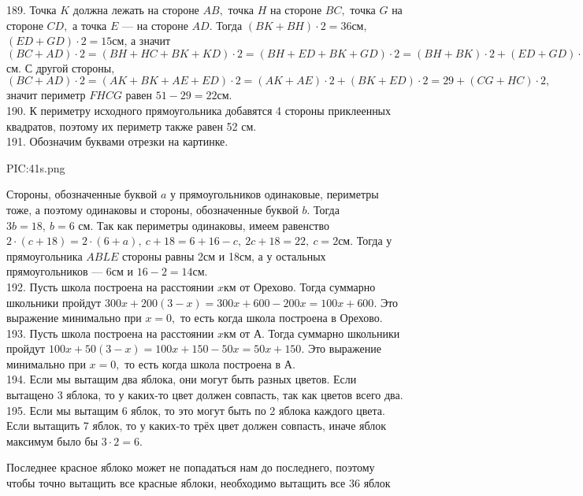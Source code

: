 189. Точка $K$ должна лежать на стороне $AB,$ точка $H$ на стороне $BC,$ точка $G$ на стороне $CD,$ а точка $E$ --- на стороне $AD.$ Тогда $(BK+BH)\cdot2=36$см, $(ED+GD)\cdot2=15$см, а значит $(BC+AD)\cdot2=(BH+HC+BK+KD)\cdot2=(BH+ED+BK+GD)\cdot2=(BH+BK)\cdot2+(ED+GD)\cdot2=36+15=51$см. С другой стороны, $(BC+AD)\cdot2=(AK+BK+AE+ED)\cdot2=(AK+AE)\cdot2+(BK+ED)\cdot2=29+(CG+HC)\cdot2,$ значит периметр $FHCG$ равен $51-29=22$см.\\
190. К периметру исходного прямоугольника добавятся 4 стороны приклеенных квадратов, поэтому их периметр также равен 52 см.\\
191. Обозначим буквами отрезки на картинке.
\begin{center}
{{PIC:41s.png}}
\end{center}
Стороны, обозначенные буквой $a$ у прямоугольников одинаковые, периметры тоже, а поэтому одинаковы и стороны, обозначенные буквой $b.$ Тогда $3b=18,\ b=6$ см. Так как периметры одинаковы, имеем равенство $2\cdot(c+18)=2\cdot(6+a),\ c+18=6+16-c,\ 2c+18=22,\ c=2$см. Тогда у прямоугольника $ABLE$ стороны равны 2см и 18см, а у остальных прямоугольников --- 6см и $16-2=14$см.\\
192. Пусть школа построена на расстоянии $x$км от Орехово. Тогда суммарно школьники пройдут $300x+200(3-x)=300x+600-200x=100x+600.$ Это выражение минимально при $x=0,$ то есть когда школа построена в Орехово.\\
193. Пусть школа построена на расстоянии $x$км от А. Тогда суммарно школьники пройдут $100x+50(3-x)=100x+150-50x=50x+150.$ Это выражение минимально при $x=0,$ то есть когда школа построена в А.\\
194. Если мы вытащим два яблока, они могут быть разных цветов. Если вытащено 3 яблока, то у каких-то цвет должен совпасть, так как цветов всего два.\\
195. Если мы вытащим 6 яблок, то это могут быть по 2 яблока каждого цвета. Если вытащить 7 яблок, то у каких-то трёх цвет должен совпасть, иначе яблок максимум было бы $3\cdot2=6.$

Последнее красное яблоко может не попадаться нам до последнего, поэтому чтобы точно вытащить все красные яблоки, необходимо вытащить все 36 яблок

